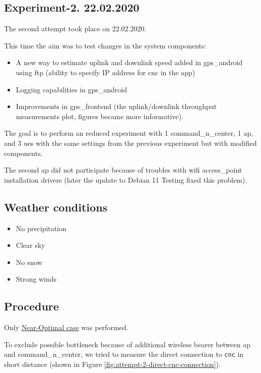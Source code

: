 \subsection{Experiment-2. 22.02.2020}\label{experiment-1.-22.02.2020}

The second attempt took place on 22.02.2020.

This time the aim was to test changes in the system components:

\begin{itemize}
	\tightlist
	\item
	A new way to estimate uplink and downlink speed added in \gls{gps_android} using \gls{ftp} (ability to specify IP address for \gls{cnc} in the app)
	\item
	Logging capabilities in \gls{gps_android}
	\item
	Improvements in \gls{gps_frontend} (the uplink/downlink throughput measurements plot, figures became more informative).
\end{itemize}



The goal is to perform an reduced experiment with 1 \gls{command_n_center}, 1 \gls{ap}, and 3 \glspl{ue} with the same settings from the previous experiment but with modified components.

The second \gls{ap} did not participate because of troubles with \gls{wifi} \gls{access_point} installation drivers (later the update to Debian 11 Testing fixed this problem).

\subsection{Weather conditions}

\begin{itemize}
	\tightlist
	\item
	No precipitation
	\item
	Clear sky
	\item
	No snow
	\item
	Strong winds
\end{itemize}

\subsection{Procedure}

Only \hyperref[near-optimal-layout]{Near-Optimal case} was performed.

To exclude possible bottleneck because of additional wireless bearer between \gls{ap} and \gls{command_n_center}, we tried to measure the direct connection to \texttt{cnc} in short distance (shown in Figure \ref{fig:attempt-2-direct-cnc-connection}).

